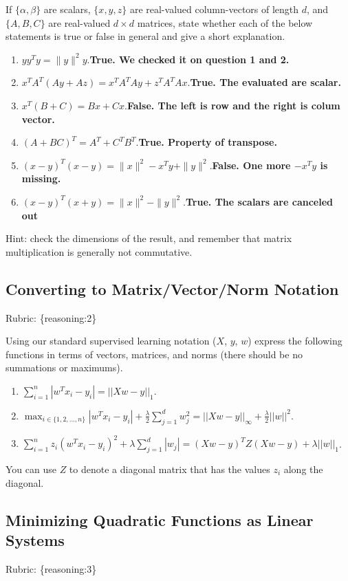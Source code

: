 \documentclass{article}
\def\rubric#1{\gre{Rubric: \{#1\}}}{}
\def\blu#1{{\color{blu}#1}}
\def\gre#1{{\color{gre}#1}}
\def\norm#1{\|#1\|}
\def\enum#1{\begin{enumerate}#1\end{enumerate}}
\begin{document}
If $\{\alpha,\beta\}$ are scalars, $\{x,y,z\}$ are real-valued column-vectors of length $d$,
and $\{A,B,C\}$ are real-valued $d\times d$ matrices, \blu{state whether each of the below statements is true or false in general
and give a short explanation.}
\enum{
\addtocounter{enumi}{6}
\item $yy^Ty = \norm{y}^2y$.\textbf{True. We checked it on question 1 and 2.}
\item $x^TA^T(Ay + Az) = x^TA^TAy + z^TA^TAx$.\textbf{True. The evaluated are scalar.}
\item $x^T(B + C) = Bx + Cx$.\textbf{False. The left is row and the right is colum vector.}
\item $(A + BC)^T = A^T + C^TB^T$.\textbf{True. Property of transpose.}
\item $(x-y)^T(x-y) = \norm{x}^2 - x^Ty + \norm{y}^2$.\textbf{\textbf{False. One more $- x^Ty$ is missing.}}
\item $(x-y)^T(x+y) = \norm{x}^2 - \norm{y}^2$.\textbf{True. The scalars are canceled out }
}

Hint: check the dimensions of the result, and remember that matrix multiplication is generally not commutative.

\subsection{Converting to Matrix/Vector/Norm Notation}
\rubric{reasoning:2}

Using our standard supervised learning notation ($X$, $y$, $w$)
express the following functions in terms of vectors, matrices, and norms (there should be no summations or maximums).
\blu{\enum{
\item $\sum_{i=1}^n |w^Tx_i - y_i|=||Xw-y||_1$.
\item $\max_{i \in \{1,2,\dots,n\}} |w^Tx_i  - y_i| + \frac{\lambda}{2}\sum_{j=1}^d w_j^2=||Xw-y||_\infty+\frac{\lambda}{2}||w||^2$.
\item $\sum_{i=1}^n z_i (w^Tx_i - y_i)^2 + \lambda \sum_{j=1}^{d} |w_j|=(Xw-y)^TZ(Xw-y)+\lambda ||w||_1$.
}}
You can use $Z$ to denote a diagonal matrix that has the values $z_i$ along the diagonal.


\subsection{Minimizing Quadratic Functions as Linear Systems}
\rubric{reasoning:3}
\end{document}
